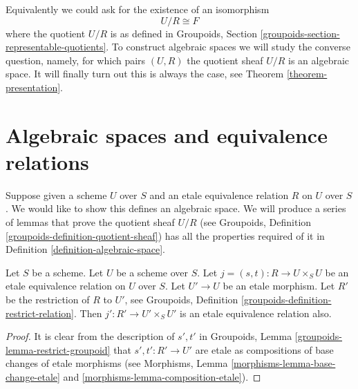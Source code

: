 \noindent
Equivalently we could ask for the existence of an isomorphism
$$
U/R \cong F
$$
where the quotient $U/R$ is as defined in
Groupoids, Section \ref{groupoids-section-representable-quotients}.
To construct algebraic spaces we will study the converse question, namely,
for which pairs $(U, R)$ the quotient sheaf $U/R$ is an algebraic space.
It will finally turn out this is always the case,
see Theorem \ref{theorem-presentation}. 





























\section{Algebraic spaces and equivalence relations}
\label{section-spaces-from-equivalence-relations}

\noindent
Suppose given a scheme $U$ over $S$
and an etale equivalence relation $R$ on $U$ over $S$.
We would like to show this defines an algebraic space.
We will produce a series of lemmas that prove the quotient sheaf $U/R$
(see Groupoids, Definition \ref{groupoids-definition-quotient-sheaf})
has all the properties required
of it in Definition \ref{definition-algebraic-space}.

\begin{lemma}
\label{lemma-pullback-etale-equivalence-relation}
Let $S$ be a scheme. Let $U$ be a scheme over $S$.
Let $j = (s, t) : R \to U \times_S U$
be an etale equivalence relation on $U$ over $S$.
Let $U' \to U$ be an etale morphism.
Let $R'$ be the restriction of $R$ to $U'$, see
Groupoids, Definition \ref{groupoids-definition-restrict-relation}.
Then $j' : R' \to U' \times_S U'$ is an etale equivalence
relation also.
\end{lemma}

\begin{proof}
It is clear from the description of $s', t'$ in
Groupoids, Lemma \ref{groupoids-lemma-restrict-groupoid}
that $s' , t' : R' \to U'$ are etale
as compositions of base changes of etale morphisms
(see Morphisms, Lemma \ref{morphisms-lemma-base-change-etale}
and \ref{morphisms-lemma-composition-etale}).
\end{proof}

